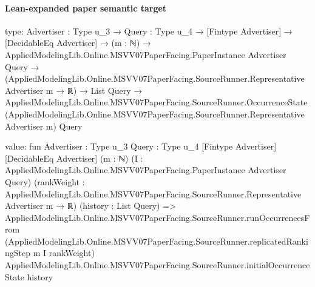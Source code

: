 \documentclass[10pt]{article}
\begin{document}
\paragraph{Lean-expanded paper semantic target}
\begin{ReviewVerbatim}
type:
{Advertiser : Type u_3} →
  {Query : Type u_4} →
    [Fintype Advertiser] →
      [DecidableEq Advertiser] →
        (m : ℕ) →
          AppliedModelingLib.Online.MSVV07PaperFacing.PaperInstance Advertiser Query →
            (AppliedModelingLib.Online.MSVV07PaperFacing.SourceRunner.Representative Advertiser m → ℝ) →
              List Query →
                AppliedModelingLib.Online.MSVV07PaperFacing.SourceRunner.OccurrenceState
                  (AppliedModelingLib.Online.MSVV07PaperFacing.SourceRunner.Representative Advertiser m) Query

value:
fun {Advertiser : Type u_3} {Query : Type u_4} [Fintype Advertiser] [DecidableEq Advertiser] (m : ℕ)
    (I : AppliedModelingLib.Online.MSVV07PaperFacing.PaperInstance Advertiser Query)
    (rankWeight : AppliedModelingLib.Online.MSVV07PaperFacing.SourceRunner.Representative Advertiser m → ℝ)
    (history : List Query) =>
  AppliedModelingLib.Online.MSVV07PaperFacing.SourceRunner.runOccurrencesFrom
    (AppliedModelingLib.Online.MSVV07PaperFacing.SourceRunner.replicatedRankingStep m I rankWeight)
    AppliedModelingLib.Online.MSVV07PaperFacing.SourceRunner.initialOccurrenceState history
\end{ReviewVerbatim}
\end{document}
